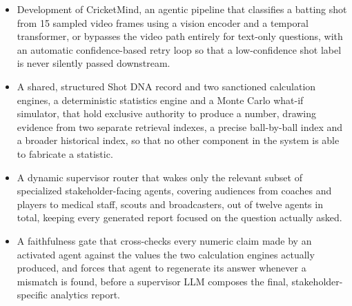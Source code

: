 \begin{itemize}
    \item Development of CricketMind, an agentic pipeline that classifies a batting shot from 15 sampled video frames using a vision encoder and a temporal transformer, or bypasses the video path entirely for text-only questions, with an automatic confidence-based retry loop so that a low-confidence shot label is never silently passed downstream.
    \item A shared, structured Shot DNA record and two sanctioned calculation engines, a deterministic statistics engine and a Monte Carlo what-if simulator, that hold exclusive authority to produce a number, drawing evidence from two separate retrieval indexes, a precise ball-by-ball index and a broader historical index, so that no other component in the system is able to fabricate a statistic.
    \item A dynamic supervisor router that wakes only the relevant subset of specialized stakeholder-facing agents, covering audiences from coaches and players to medical staff, scouts and broadcasters, out of twelve agents in total, keeping every generated report focused on the question actually asked.
    \item A faithfulness gate that cross-checks every numeric claim made by an activated agent against the values the two calculation engines actually produced, and forces that agent to regenerate its answer whenever a mismatch is found, before a supervisor LLM composes the final, stakeholder-specific analytics report.
\end{itemize}